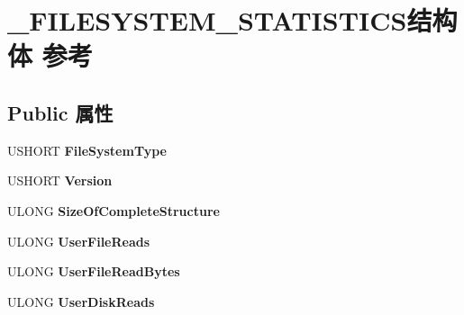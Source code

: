 \hypertarget{struct___f_i_l_e_s_y_s_t_e_m___s_t_a_t_i_s_t_i_c_s}{}\section{\+\_\+\+F\+I\+L\+E\+S\+Y\+S\+T\+E\+M\+\_\+\+S\+T\+A\+T\+I\+S\+T\+I\+C\+S结构体 参考}
\label{struct___f_i_l_e_s_y_s_t_e_m___s_t_a_t_i_s_t_i_c_s}
\subsection*{Public 属性}
\begin{DoxyCompactItemize}
\item 
\mbox{\label{struct___f_i_l_e_s_y_s_t_e_m___s_t_a_t_i_s_t_i_c_s_ad77e68aaba440b9da7bbc19f99b3ccf7}} 
U\+S\+H\+O\+RT {\bfseries File\+System\+Type}
\item 
\mbox{\label{struct___f_i_l_e_s_y_s_t_e_m___s_t_a_t_i_s_t_i_c_s_a7ea1bfd8ac163774250cf57f5ed0a0e6}} 
U\+S\+H\+O\+RT {\bfseries Version}
\item 
\mbox{\label{struct___f_i_l_e_s_y_s_t_e_m___s_t_a_t_i_s_t_i_c_s_a899afbf92a6474893bd975507811439f}} 
U\+L\+O\+NG {\bfseries Size\+Of\+Complete\+Structure}
\item 
\mbox{\label{struct___f_i_l_e_s_y_s_t_e_m___s_t_a_t_i_s_t_i_c_s_a2460c07ea7413fea1d9e27b9d9da20c7}} 
U\+L\+O\+NG {\bfseries User\+File\+Reads}
\item 
\mbox{\label{struct___f_i_l_e_s_y_s_t_e_m___s_t_a_t_i_s_t_i_c_s_a5b5a4e623ba9a238f1c95dc7260f65e8}} 
U\+L\+O\+NG {\bfseries User\+File\+Read\+Bytes}
\item 
\mbox{\label{struct___f_i_l_e_s_y_s_t_e_m___s_t_a_t_i_s_t_i_c_s_a831d7c7c45da96f5132dcdf8716042f2}} 
U\+L\+O\+NG {\bfseries User\+Disk\+Reads}
\item 
\mbox{\label{struct___f_i_l_e_s_y_s_t_e_m___s_t_a_t_i_s_t_i_c_s_a3f9f10693e95d01fda5bdac20066daaf}} 

\end{DoxyCompactItemize}
